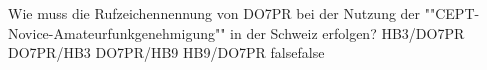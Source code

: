     {Wie muss die Rufzeichennennung von DO7PR bei der Nutzung der ""CEPT-Novice-Amateurfunkgenehmigung"" in der Schweiz erfolgen?}
    {HB3/DO7PR}
    {DO7PR/HB3}
    {DO7PR/HB9}
    {HB9/DO7PR}
    {false}{false}